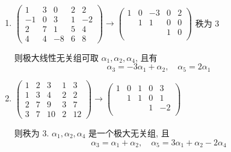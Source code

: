 	 \paragraph{} %
		 \begin{enumerate}
			 \item %
			       \( \begin{pmatrix}
				       1  & 3 & 0  & 2 & 2  \\
				       -1 & 0 & 3  & 1 & -2 \\
				       2  & 7 & 1  & 5 & 4  \\
				       4  & 4 & -8 & 6 & 8
			       \end{pmatrix} \to
			       \begin{pmatrix}
				       1 & 0 & -3 & 0 & 2 \\
				         & 1 & 1  & 0 & 0 \\
				         &   &    & 1 & 0 \\
				         &   &    &   &
			       \end{pmatrix} \) 秩为 3

			       则极大线性无关组可取 \( \alpha_{1}, \alpha_{2}, \alpha_{4} \), 且有
			       \[
				       \alpha_{3} = -3\alpha_{1} + \alpha_{2}, \quad \alpha_{5} = 2\alpha_{1}
			       \]

			 \item %
			       \( \begin{pmatrix}
				       1 & 2 & 3  & 1 & 3  \\
				       1 & 3 & 4  & 2 & 2  \\
				       2 & 7 & 9  & 3 & 7  \\
				       3 & 7 & 10 & 2 & 12
			       \end{pmatrix} \to \begin{pmatrix}
				       1 & 0 & 1 & 0 & 3  \\
				         & 1 & 1 & 0 & 1  \\
				         &   &   & 1 & -2 \\
				         &   &   &
			       \end{pmatrix} \)

			       则秩为 3. \( \alpha_{1}, \alpha_{2}, \alpha_{4} \) 是一个极大无关组, 且
			       \[
				       \alpha_{3} = \alpha_{1} + \alpha_{2}, \quad \alpha_{5} = 3\alpha_{1} + \alpha_{2} - 2\alpha_{4}
			       \]
		 \end{enumerate}



